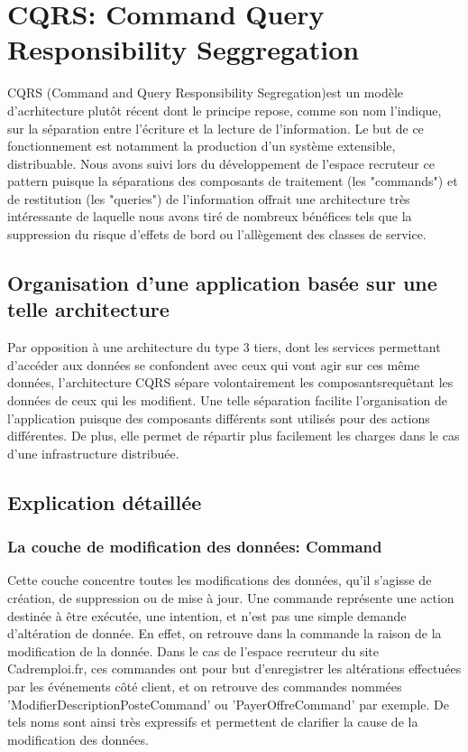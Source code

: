 \section{CQRS: Command Query Responsibility Seggregation}
\label{sec:CQRS: Command Query Responsibility Seggregation}
CQRS (Command and Query Responsibility Segregation)est un modèle d'acrhitecture plutôt récent dont le principe repose, comme son nom l'indique, sur la séparation entre l'écriture et la lecture de l'information.
Le but de ce fonctionnement est notamment la production d'un système extensible, distribuable.
Nous avons suivi lors du développement de l'espace recruteur ce pattern puisque la séparations des composants de traitement (les "commands") et de restitution (les "queries") de l'information offrait une architecture très intéressante de laquelle nous avons tiré de nombreux bénéfices tels que la suppression du risque d'effets de bord ou l'allègement des classes de service.

\subsection{Organisation d'une application basée sur une telle architecture}
Par opposition à une architecture du type 3 tiers, dont les services permettant d'accéder aux données se confondent avec ceux qui vont agir sur ces même données, l'architecture CQRS sépare volontairement les composantsrequêtant les données de ceux qui les modifient.
Une telle séparation facilite l'organisation de l'application puisque des composants différents sont utilisés pour des actions différentes.
De plus, elle permet de répartir plus facilement les charges dans le cas d'une infrastructure distribuée.

\subsection{Explication détaillée}
\label{sub:explication}
\subsubsection{La couche de modification des données: Command}
\label{subs:La couche de modification des données: Command}
Cette couche concentre toutes les modifications des données, qu'il s'agisse de création, de suppression ou de mise à jour.
Une commande représente une action destinée à être exécutée, une intention, et n'est pas une simple demande d'altération de donnée.
En effet, on retrouve dans la commande la raison de la modification de la donnée.
Dans le cas de l'espace recruteur du site Cadremploi.fr, ces commandes ont pour but d'enregistrer les altérations effectuées par les événements côté client, et on retrouve des commandes nommées 'ModifierDescriptionPosteCommand' ou 'PayerOffreCommand' par exemple.
De tels noms sont ainsi très expressifs et permettent de clarifier la cause de la modification des données.

